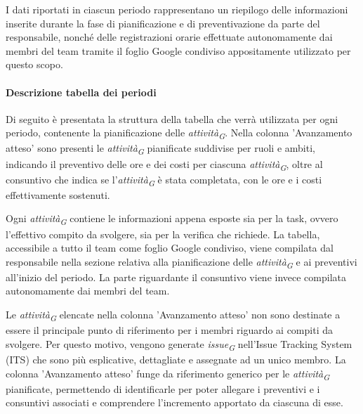 \vspace{0.2cm}

I dati riportati in ciascun periodo rappresentano un riepilogo delle informazioni inserite durante la fase di pianificazione e di preventivazione da parte del responsabile, nonché delle registrazioni orarie effettuate autonomamente dai membri del team tramite il foglio Google condiviso appositamente utilizzato per questo scopo.

\paragraph{Descrizione tabella dei periodi}\label{sec:DescrTabella}

Di seguito è presentata la struttura della tabella che verrà utilizzata per ogni periodo, contenente la pianificazione delle \textit{attività}\textsubscript{\textit{G}}. Nella colonna 'Avanzamento atteso' sono presenti le \textit{attività}\textsubscript{\textit{G}} pianificate suddivise per ruoli e ambiti, indicando il preventivo delle ore e dei costi per ciascuna \textit{attività}\textsubscript{\textit{G}}, oltre al consuntivo che indica se l'\textit{attività}\textsubscript{\textit{G}} è stata completata, con le ore e i costi effettivamente sostenuti.

\vspace{0.2cm}

Ogni \textit{attività}\textsubscript{\textit{G}} contiene le informazioni appena esposte sia per la task, ovvero l'effettivo compito da svolgere,  sia per la verifica che richiede.
La tabella, accessibile a tutto il team come foglio Google condiviso, viene compilata dal responsabile nella sezione relativa alla pianificazione delle \textit{attività}\textsubscript{\textit{G}} e ai preventivi all'inizio del periodo. La parte riguardante il consuntivo viene invece compilata autonomamente dai membri del team.

\vspace{0.2cm}

Le \textit{attività}\textsubscript{\textit{G}} elencate nella colonna 'Avanzamento atteso' non sono destinate a essere il principale punto di riferimento per i membri riguardo ai compiti da svolgere. Per questo motivo, vengono generate \textit{issue}\textsubscript{\textit{G}} nell'Issue Tracking System (ITS) che sono più esplicative, dettagliate e assegnate ad un unico membro. La colonna 'Avanzamento atteso' funge da riferimento generico per le \textit{attività}\textsubscript{\textit{G}} pianificate, permettendo di identificarle per poter allegare i preventivi e i consuntivi associati e comprendere l'incremento apportato da ciascuna di esse.

